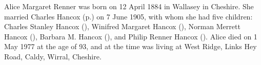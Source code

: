
Alice Margaret Renner was born on 12 April 1884 in Wallasey in Cheshire.\cite{UKCensus1911_RG14_22074} She married Charles Hancox (p.\pageref{Charles_Edward_Hancox}) on 7 June 1905\cite{UKParishRegisters}, with whom she had five children: Charles Stanley Hancox (), Winifred Margaret Hancox (), Norman Merrett Hancox (), Barbara M. Hancox (), and Philip Renner Hancox (). 
Alice died on 1 May 1977 at the age of 93, and at the time was living at West Ridge, Links Hey Road, Caldy, Wirral, Cheshire. \cite{AMRennerDeath} 
